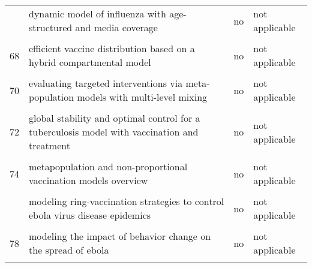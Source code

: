 \documentclass[
]{article}
\begin{document}
\begin{landscape}
\begin{longtable}{l>{\raggedright\arraybackslash}p{4cm}l>{\raggedright\arraybackslash}p{4cm}}
\addlinespace
66 & dynamic model of influenza with age-structured and media coverage & no & not applicable\\
\cellcolor{gray!6}{67} & \cellcolor{gray!6}{economic evaluation of individual school closure strategies: the hong kong 2009 h1n1 pandemic} & \cellcolor{gray!6}{no} & \cellcolor{gray!6}{not applicable}\\
68 & efficient vaccine distribution based on a hybrid compartmental model & no & not applicable\\
\cellcolor{gray!6}{69} & \cellcolor{gray!6}{epidemiological evaluation of different fmd control strategies in two selected regions in austria} & \cellcolor{gray!6}{yes} & \cellcolor{gray!6}{inconclusive}\\
70 & evaluating targeted interventions via meta-population models with multi-level mixing & no & not applicable\\
\addlinespace
\cellcolor{gray!6}{71} & \cellcolor{gray!6}{evaluation of outbreak response immunization in the control of pertussis using agent-based modeling} & \cellcolor{gray!6}{no} & \cellcolor{gray!6}{not applicable}\\
72 & global stability and optimal control for a tuberculosis model with vaccination and treatment & no & not applicable\\
\cellcolor{gray!6}{73} & \cellcolor{gray!6}{impact on epidemic measles of vaccination campaigns triggered by disease outbreaks or serosurveys: a modeling study} & \cellcolor{gray!6}{no} & \cellcolor{gray!6}{not applicable}\\
74 & metapopulation and non-proportional vaccination models overview & no & not applicable\\
\cellcolor{gray!6}{75} & \cellcolor{gray!6}{model-based comprehensive analysis of school closure policies for mitigating influenza epidemics and pandemics} & \cellcolor{gray!6}{no} & \cellcolor{gray!6}{not applicable}\\
\addlinespace
76 & modeling ring-vaccination strategies to control ebola virus disease epidemics & no & not applicable\\
\cellcolor{gray!6}{77} & \cellcolor{gray!6}{modeling the effect of public health resources and alerting on the dynamics of pertussis spread*} & \cellcolor{gray!6}{no} & \cellcolor{gray!6}{not applicable}\\
78 & modeling the impact of behavior change on the spread of ebola & no & not applicable\\
\cellcolor{gray!6}{79} & \cellcolor{gray!6}{modeling the spread of polio in an ipv-vaccinated population: lessons learned from the 2013 silent outbreak in southern israel} & \cellcolor{gray!6}{no} & \cellcolor{gray!6}{not applicable}\\

\end{longtable}
\end{landscape}
\end{document}

